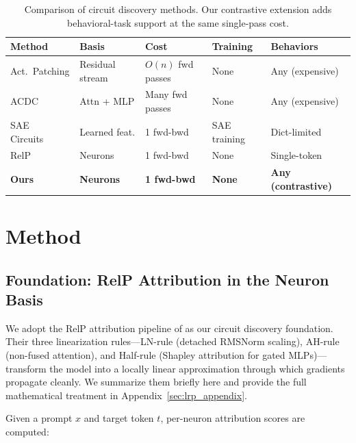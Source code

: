 \documentclass[11pt]{article}
\begin{document}
\begin{table}[t]
\centering
\caption{Comparison of circuit discovery methods. Our contrastive extension adds behavioral-task support at the same single-pass cost.}
\label{tab:landscape}
\footnotesize
\begin{tabular}{lllll}
\toprule
\textbf{Method} & \textbf{Basis} & \textbf{Cost} & \textbf{Training} & \textbf{Behaviors} \\
\midrule
Act.\ Patching & Residual stream & $O(n)$ fwd passes & None & Any (expensive) \\
ACDC~\citep{conmy2023acdc} & Attn + MLP & Many fwd passes & None & Any (expensive) \\
SAE Circuits~\citep{marks2024sparse} & Learned feat. & 1 fwd-bwd & SAE training & Dict-limited \\
RelP~\citep{arora2025circuits} & Neurons & 1 fwd-bwd & None & Single-token \\
\textbf{Ours} & \textbf{Neurons} & \textbf{1 fwd-bwd} & \textbf{None} & \textbf{Any (contrastive)} \\
\bottomrule
\end{tabular}
\end{table}


\section{Method}
\label{sec:method}

\subsection{Foundation: RelP Attribution in the Neuron Basis}
\label{sec:foundation}

We adopt the RelP attribution pipeline of \citet{arora2025circuits} as our circuit discovery foundation.
Their three linearization rules---LN-rule (detached RMSNorm scaling), AH-rule (non-fused attention), and Half-rule (Shapley attribution for gated MLPs)---transform the model into a locally linear approximation through which gradients propagate cleanly.
We summarize them briefly here and provide the full mathematical treatment in Appendix~\ref{sec:lrp_appendix}.

Given a prompt $x$ and target token $t$, per-neuron attribution scores are computed:
\end{document}
